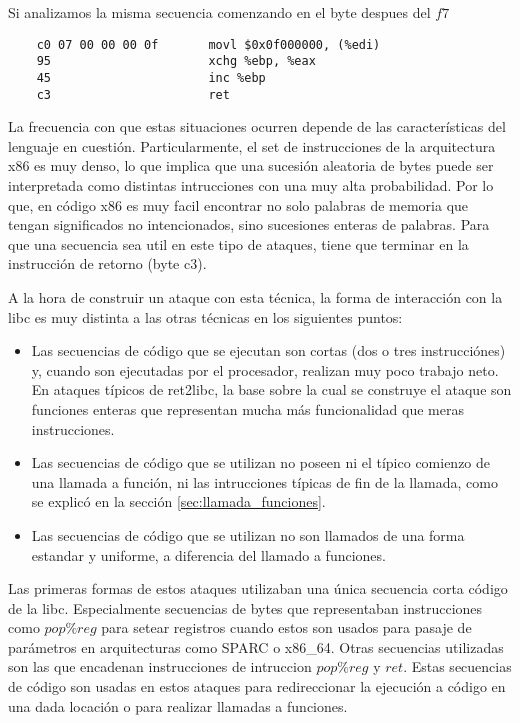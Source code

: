 	\vspace{5 mm}
	
	Si analizamos la misma secuencia comenzando en el byte despues del $f7$
	
	\vspace{5 mm}
	
	\begin{lstlisting}
	c0 07 00 00 00 0f		movl $0x0f000000, (%edi)
	95               		xchg %ebp, %eax
	45               		inc %ebp
	c3               		ret
	\end{lstlisting}
	
	\vspace{5 mm}
	
	La frecuencia con que estas situaciones ocurren depende de las caracter\'isticas del lenguaje en cuesti\'on. Particularmente, el set de instrucciones de la arquitectura x86 es muy denso, lo que implica que una sucesi\'on aleatoria de bytes puede ser interpretada como distintas intrucciones con una muy alta probabilidad. Por lo que, en c\'odigo x86 es muy facil encontrar no solo palabras de memoria que tengan significados no intencionados, sino sucesiones enteras de palabras. Para que una secuencia sea util en este tipo de ataques, tiene que terminar en la instrucci\'on de retorno (byte c3).
	
	A la hora de construir un ataque con esta t\'ecnica, la forma de interacci\'on con la libc es muy distinta a las otras t\'ecnicas en los siguientes puntos:
	\begin{itemize}
		\item Las secuencias de c\'odigo que se ejecutan son cortas (dos o tres instrucci\'ones) y, cuando son ejecutadas por el procesador, realizan muy poco trabajo neto. En ataques t\'ipicos de ret2libc, la base sobre la cual se construye el ataque son funciones enteras que representan mucha m\'as funcionalidad que meras instrucciones.
		\item Las secuencias de c\'odigo que se utilizan no poseen ni el t\'ipico comienzo de una llamada a funci\'on, ni las intrucciones t\'ipicas de fin de la llamada, como se explic\'o en la secci\'on \ref{sec:llamada_funciones}.
		\item Las secuencias de c\'odigo que se utilizan no son llamados de una forma estandar y uniforme, a diferencia del llamado a funciones.
	\end{itemize}
	
	Las primeras formas de estos ataques utilizaban una \'unica secuencia corta c\'odigo de la libc. Especialmente secuencias de bytes que representaban instrucciones como $pop \%reg$ para setear registros cuando estos son usados para pasaje de par\'ametros en arquitecturas como SPARC o x86\_64. Otras secuencias utilizadas son las que encadenan instrucciones de intruccion $pop \%reg$ y $ret$. Estas secuencias de c\'odigo son usadas en estos ataques para redireccionar la ejecuci\'on a c\'odigo en una dada locaci\'on o para realizar llamadas a funciones.
	
